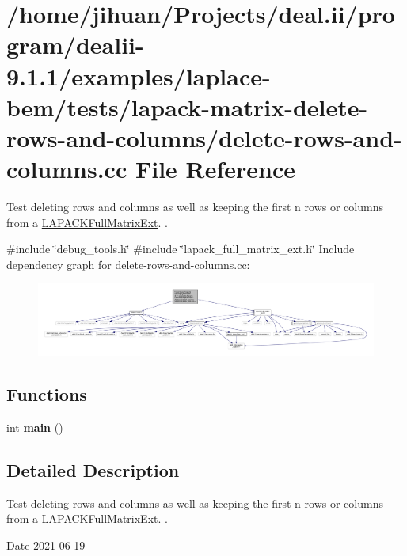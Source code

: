 \hypertarget{delete-rows-and-columns_8cc}{}\section{/home/jihuan/\+Projects/deal.ii/program/dealii-\/9.1.1/examples/laplace-\/bem/tests/lapack-\/matrix-\/delete-\/rows-\/and-\/columns/delete-\/rows-\/and-\/columns.cc File Reference}
\label{delete-rows-and-columns_8cc}


Test deleting rows and columns as well as keeping the first {\ttfamily n} rows or columns from a \hyperlink{classLAPACKFullMatrixExt}{L\+A\+P\+A\+C\+K\+Full\+Matrix\+Ext}. .  


{\ttfamily \#include \char`\"{}debug\+\_\+tools.\+h\char`\"{}}\newline
{\ttfamily \#include \char`\"{}lapack\+\_\+full\+\_\+matrix\+\_\+ext.\+h\char`\"{}}\newline
Include dependency graph for delete-\/rows-\/and-\/columns.cc\+:
\nopagebreak
\begin{figure}[H]
\begin{center}
\leavevmode
\includegraphics[width=350pt]{delete-rows-and-columns_8cc__incl}
\end{center}
\end{figure}
\subsection*{Functions}
\begin{DoxyCompactItemize}
\item 
\mbox{\label{delete-rows-and-columns_8cc_ae66f6b31b5ad750f1fe042a706a4e3d4}} 
int {\bfseries main} ()
\end{DoxyCompactItemize}


\subsection{Detailed Description}
Test deleting rows and columns as well as keeping the first {\ttfamily n} rows or columns from a \hyperlink{classLAPACKFullMatrixExt}{L\+A\+P\+A\+C\+K\+Full\+Matrix\+Ext}. . 

\begin{DoxyDate}{Date}
2021-\/06-\/19 
\end{DoxyDate}
